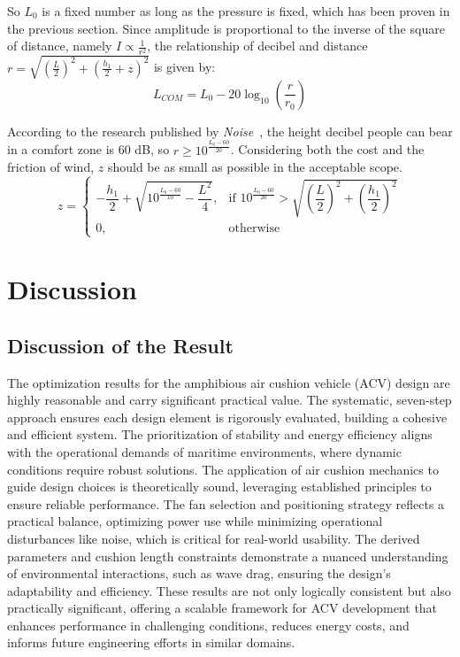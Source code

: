 So $L_0$ is a fixed number as long as the pressure is fixed, which has been proven in the previous section.
Since amplitude is proportional to the inverse of the square of distance, namely $I \propto \frac{1}{r^2}$, the relationship of decibel and distance $r = \sqrt{(\frac{L}{2})^2+(\frac{h_1}{2}+z)^2}$ is given by:
\begin{equation} 
L_{COM} = L_0 - 20 \log_{10}\left(\frac{r}{r_0}\right)
\end{equation}

According to the research published by \textit{Noise}~\cite{kahneman2021noise}, the height decibel people can bear in a comfort zone is 60 dB, so $r \geq 10^{\frac{L_0 - 60}{20}}$. Considering both the cost and the friction of wind, $z$ should be as small as possible in the acceptable scope.
\[
z =
\begin{cases}
-\dfrac{h_1}{2} + \sqrt{10^{\frac{L_0 - 60}{10}} - \dfrac{L^2}{4}}, & \text{if } 10^{\frac{L_0 - 60}{20}} > \sqrt{\left(\dfrac{L}{2}\right)^2 + \left(\dfrac{h_1}{2}\right)^2} \\
0, & \text{otherwise}
\end{cases}
\]






\section{Discussion}
\subsection{Discussion of the Result}
The optimization results for the amphibious air cushion vehicle (ACV) design are highly reasonable and carry significant practical value. The systematic, seven-step approach ensures each design element is rigorously evaluated, building a cohesive and efficient system. The prioritization of stability and energy efficiency aligns with the operational demands of maritime environments, where dynamic conditions require robust solutions. The application of air cushion mechanics to guide design choices is theoretically sound, leveraging established principles to ensure reliable performance. The fan selection and positioning strategy reflects a practical balance, optimizing power use while minimizing operational disturbances like noise, which is critical for real-world usability. The derived parameters and cushion length constraints demonstrate a nuanced understanding of environmental interactions, such as wave drag, ensuring the design’s adaptability and efficiency. These results are not only logically consistent but also practically significant, offering a scalable framework for ACV development that enhances performance in challenging conditions, reduces energy costs, and informs future engineering efforts in similar domains.

